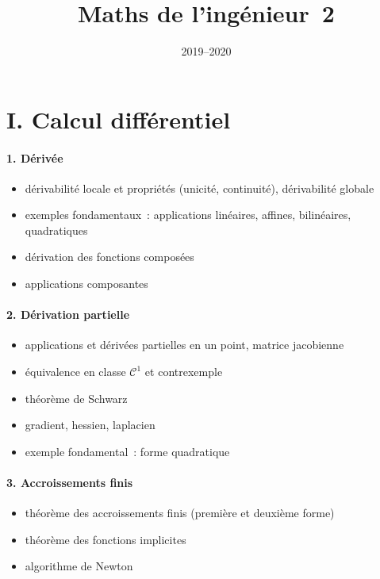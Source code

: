 \documentclass[11pt,a4paper]{article}
\title{Maths de l'ing\'enieur~2}
\date{2019--2020}
\def\CC{\mathscr{C}}
\theoremstyle{plain}
\theoremstyle{definition}
\begin{document}
\maketitle

\section*{I. Calcul diff\'erentiel}
\paragraph{1. D\'eriv\'ee}
\begin{itemize}
\item d\'erivabilit\'e locale et propri\'et\'es (unicit\'e, continuit\'e),
d\'erivabilit\'e globale
\item exemples fondamentaux~: applications lin\'eaires, affines, bilin\'eaires,
quadratiques
\item d\'erivation des fonctions compos\'ees
\item applications composantes
\end{itemize}

\paragraph{2. D\'erivation partielle}
\begin{itemize}
\item applications et d\'eriv\'ees partielles en un point, matrice jacobienne
\item \'equivalence en classe $\CC^1$ et contrexemple
\item th\'eor\`eme de Schwarz
\item gradient, hessien, laplacien
\item exemple fondamental~: forme quadratique
\end{itemize}

\paragraph{3. Accroissements finis} 
\begin{itemize}
\item th\'eor\`eme des accroissements finis (premi\`ere et deuxi\`eme forme)
\item th\'eor\`eme des fonctions implicites
\item algorithme de Newton
\end{itemize}
\end{document}
